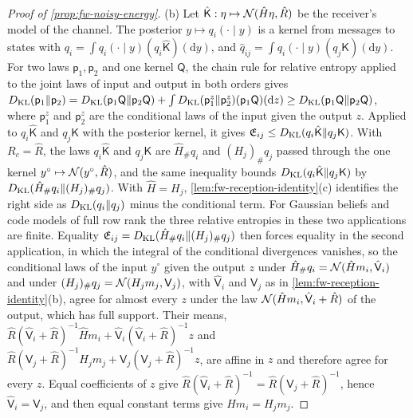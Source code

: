 \begin{proof}[Proof of \cref{prop:fw-noisy-energy}]
(b) Let $\hat{\mathsf K}:\eta\mapsto\mathcal{N}(\hat H\eta,\hat R)$ be the receiver's model of the channel. The posterior $y\mapsto q_i(\cdot\mid y)$ is a kernel from messages to states with $q_i=\int q_i(\cdot\mid y)(q_i\hat{\mathsf K})(\mathrm dy)$, and $\hat q_{ij}=\int q_i(\cdot\mid y)(q_j\mathsf K)(\mathrm dy)$. For two laws $\mathsf p_1,\mathsf p_2$ and one kernel $\mathsf Q$, the chain rule for relative entropy applied to the joint laws of input and output in both orders gives $D_{\mathrm{KL}}(\mathsf p_1\Vert\mathsf p_2)=D_{\mathrm{KL}}(\mathsf p_1\mathsf Q\Vert\mathsf p_2\mathsf Q)+\int D_{\mathrm{KL}}(\mathsf p_1^z\Vert\mathsf p_2^z)(\mathsf p_1\mathsf Q)(\mathrm dz)\ge D_{\mathrm{KL}}(\mathsf p_1\mathsf Q\Vert\mathsf p_2\mathsf Q)$, where $\mathsf p_1^z$ and $\mathsf p_2^z$ are the conditional laws of the input given the output $z$. Applied to $q_i\hat{\mathsf K}$ and $q_j\mathsf K$ with the posterior kernel, it gives $\mathfrak E_{ij}\le D_{\mathrm{KL}}(q_i\hat{\mathsf K}\Vert q_j\mathsf K)$. With $R_c=\hat R$, the laws $q_i\hat{\mathsf K}$ and $q_j\mathsf K$ are $\hat H_\#q_i$ and $(H_j)_\#q_j$ passed through the one kernel $y^\circ\mapsto\mathcal{N}(y^\circ,\hat R)$, and the same inequality bounds $D_{\mathrm{KL}}(q_i\hat{\mathsf K}\Vert q_j\mathsf K)$ by $D_{\mathrm{KL}}(\hat H_\#q_i\Vert(H_j)_\#q_j)$. With $\hat H=H_j$, \cref{lem:fw-reception-identity}(c) identifies the right side as $D_{\mathrm{KL}}(q_i\Vert q_j)$ minus the conditional term. For Gaussian beliefs and code models of full row rank the three relative entropies in these two applications are finite. Equality $\mathfrak E_{ij}=D_{\mathrm{KL}}(\hat H_\#q_i\Vert(H_j)_\#q_j)$ then forces equality in the second application, in which the integral of the conditional divergences vanishes, so the conditional laws of the input $y^\circ$ given the output $z$ under $\hat H_\#q_i=\mathcal{N}(\hat Hm_i,\hat{\mathsf V}_i)$ and under $(H_j)_\#q_j=\mathcal{N}(H_jm_j,\mathsf V_j)$, with $\hat{\mathsf V}_i$ and $\mathsf V_j$ as in \cref{lem:fw-reception-identity}(b), agree for almost every $z$ under the law $\mathcal{N}(\hat Hm_i,\hat{\mathsf V}_i+\hat R)$ of the output, which has full support. Their means, $\hat R(\hat{\mathsf V}_i+\hat R)^{-1}\hat Hm_i+\hat{\mathsf V}_i(\hat{\mathsf V}_i+\hat R)^{-1}z$ and $\hat R(\mathsf V_j+\hat R)^{-1}H_jm_j+\mathsf V_j(\mathsf V_j+\hat R)^{-1}z$, are affine in $z$ and therefore agree for every $z$. Equal coefficients of $z$ give $\hat R(\hat{\mathsf V}_i+\hat R)^{-1}=\hat R(\mathsf V_j+\hat R)^{-1}$, hence $\hat{\mathsf V}_i=\mathsf V_j$, and then equal constant terms give $\hat Hm_i=H_jm_j$.
\end{proof}

